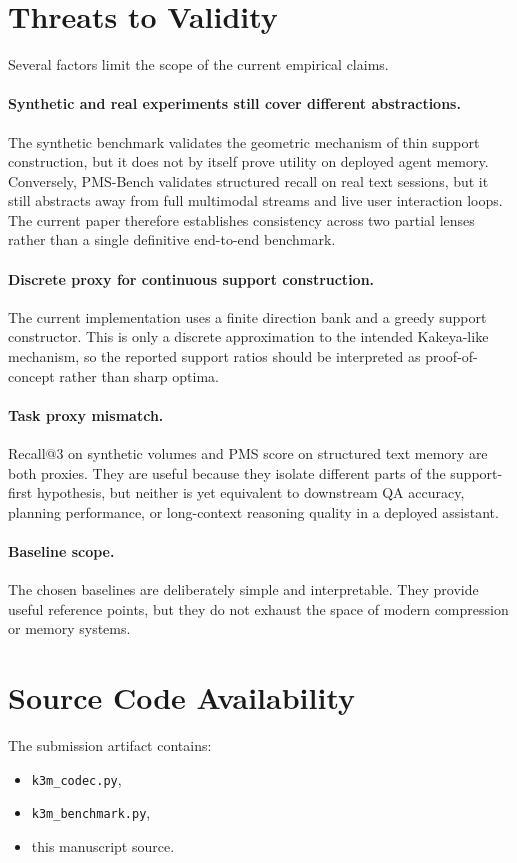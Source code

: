 \documentclass[11pt]{article}
\begin{document}
\section{Threats to Validity}
Several factors limit the scope of the current empirical claims.

\paragraph{Synthetic and real experiments still cover different abstractions.}
The synthetic benchmark validates the geometric mechanism of thin support construction, but it does not by itself prove utility on deployed agent memory. Conversely, PMS-Bench validates structured recall on real text sessions, but it still abstracts away from full multimodal streams and live user interaction loops. The current paper therefore establishes consistency across two partial lenses rather than a single definitive end-to-end benchmark.

\paragraph{Discrete proxy for continuous support construction.}
The current implementation uses a finite direction bank and a greedy support constructor. This is only a discrete approximation to the intended Kakeya-like mechanism, so the reported support ratios should be interpreted as proof-of-concept rather than sharp optima.

\paragraph{Task proxy mismatch.}
Recall@3 on synthetic volumes and PMS score on structured text memory are both proxies. They are useful because they isolate different parts of the support-first hypothesis, but neither is yet equivalent to downstream QA accuracy, planning performance, or long-context reasoning quality in a deployed assistant.

\paragraph{Baseline scope.}
The chosen baselines are deliberately simple and interpretable. They provide useful reference points, but they do not exhaust the space of modern compression or memory systems.

\section{Source Code Availability}
The submission artifact contains:
\begin{itemize}[leftmargin=1.5em]
\item \texttt{k3m\_codec.py},
\item \texttt{k3m\_benchmark.py},
\item this manuscript source.
\end{itemize}
\end{document}
